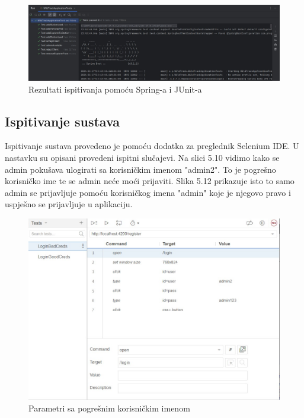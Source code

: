 			\begin{figure}[H]
				\centering
				\includegraphics[width=\textwidth]{slike/ispis.JPEG}
				\caption{Rezultati ispitivanja pomoću Spring-a i JUnit-a}
				\label{fig:dijagram_baze}
			\end{figure}
			
			\vspace{108pt}
			
			\subsection{Ispitivanje sustava}
			
			 Ispitivanje sustava provedeno je pomoću dodatka za preglednik Selenium IDE. U nastavku su opisani provedeni ispitni slučajevi. Na slici 5.10 vidimo kako se admin pokušava ulogirati sa korisničkim imenom "admin2". To je pogrešno korisničko ime te se admin neće moći prijaviti. Slika 5.12 prikazuje isto to samo admin se prijavljuje pomoću korisničkog imena "admin" koje je njegovo pravo i uspješno se prijavljuje u aplikaciju.
			 
			 \begin{figure}[H]
			 	\centering
			 	\includegraphics[width=\textwidth]{slike/krivi.JPEG}
			 	\caption{Parametri sa pogrešnim korisničkim imenom}
			 	\label{fig:dijagram_baze}
			 \end{figure}
			 

